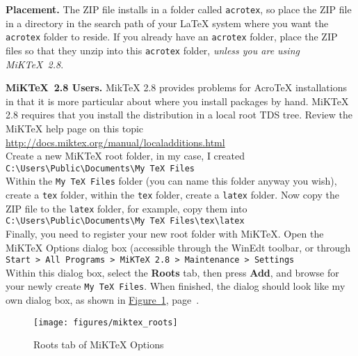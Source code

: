 \documentclass{article}
\def\latex/{{\protect\LaTeX}}
\def\tex/{{\protect\TeX}}
\begin{document}
\begin{questions}

\item \textbf{Placement.} The ZIP file installs in a folder called \texttt{acrotex}, so place
the ZIP file in a directory in the search path of your \LaTeX{} system
where you want the \texttt{acrotex} folder to reside. If you already have
an \texttt{acrotex} folder, place the ZIP files so that they unzip into this
\texttt{acrotex} folder, \emph{unless you are using MiK\TeX~2.8}.

\item[] \textbf{MiK\TeX~2.8 Users.} MikTeX 2.8 provides problems for
    {Acro\!\TeX} installations in that it is more particular about where you
    install packages by hand. MiKTeX 2.8 requires that you install the
    distribution in a local root TDS tree. Review the MiKTeX help page on this
    topic\\[3pt]\hspace*{20pt}
%
    \url{http://docs.miktex.org/manual/localadditions.html}\\[3pt]
%
Create a new {MiK\TeX} root folder, in my case, I created\\[3pt]\hspace*{20pt}
%
    \verb!C:\Users\Public\Documents\My TeX Files!\\[3pt]
%
Within the \texttt{My TeX Files} folder (you can name this folder anyway
you wish), create a \texttt{tex} folder, within the \texttt{tex} folder,
create a \texttt{latex} folder. Now copy the ZIP file to the
\texttt{latex} folder, for example, copy them into
\\[3pt]\hspace*{20pt}
%
    \verb!C:\Users\Public\Documents\My TeX Files\tex\latex!\\[3pt]
%
Finally, you need to register your new root folder with MiK\TeX. Open the
{MiK\TeX} Options dialog box (accessible through the WinEdt toolbar, or
through\\[3pt]\hspace*{20pt}
%
\texttt{Start > All Programs > MiKTeX 2.8 > Maintenance > Settings}\\[3pt]
%
Within this dialog box, select the \textbf{Roots} tab, then press
\textbf{Add}, and browse for your newly create \texttt{My TeX Files}. When
finished, the dialog should look like my own dialog box, as shown
in \hyperref[fig:rootstab]{Figure~\ref*{fig:rootstab}}, page~\pageref*{fig:rootstab}.

\begin{figure}[hbt]
\begin{center}
\texttt{[image: figures/miktex\_roots]}
\caption{Roots tab of MiK{\TeX} Options}\label{fig:rootstab}
\end{center}
\end{figure}


\end{questions}
\end{document}
